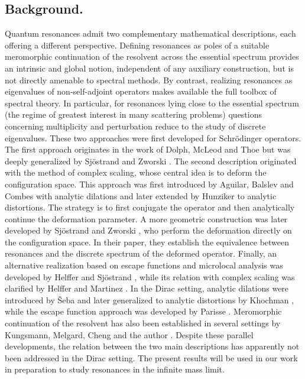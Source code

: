 \documentclass[a4paper, 12pt]{amsart}
\numberwithin{equation}{section}
\begin{document}
\subsection*{Background.} Quantum resonances admit two complementary mathematical descriptions, each offering a different perspective. Defining resonances as poles of a suitable meromorphic continuation of the resolvent across the essential spectrum provides an intrinsic and global notion, independent of any auxiliary construction, but is not directly amenable to spectral methods. By contrast, realizing resonances as eigenvalues of non-self-adjoint operators makes available the full toolbox of spectral theory. In particular, for resonances lying close to the essential spectrum (the regime of greatest interest in many scattering problems) questions concerning multiplicity and perturbation reduce to the study of discrete eigenvalues. These two approaches were first developed for Schrödinger operators. The first approach originates in the work of Dolph, McLeod and Thoe \cite{DoMcLTh66} but was deeply generalized by Sjöstrand and Zworski \cite{SjZw91}. The second description originated with the method of complex scaling, whose central idea is to deform the configuration space. This approach was first introduced by Aguilar, Balslev and Combes \cite{AgCo71,BaCo71} with analytic dilations and later extended by Hunziker \cite{Hu86} to analytic distortions. The strategy is to first conjugate the operator and then analytically continue the deformation parameter. A more geometric construction was later developed by Sjöstrand and Zworski \cite{SjZw91}, who perform the deformation directly on the configuration space. In their paper, they establish the equivalence between resonances and the discrete spectrum of the deformed operator. Finally, an alternative realization based on escape functions and microlocal analysis was developed by Helffer and Sjöstrand \cite{HeSj86}, while its relation with complex scaling was clarified by Helffer and Martinez \cite{HeMa87}. In the Dirac setting, analytic dilations were introduced by Šeba \cite{Se88} and later generalized to analytic distortions by Khochman \cite{Kh07}, while the escape function approach was developed by Parisse \cite{Pa91}. Meromorphic continuation of the resolvent has also been established in several settings by Kungsmann, Melgard, Cheng and the author \cite{KuMe17,ChMe21,Du25}. Despite these parallel developments, the relation between the two main descriptions has apparently not been addressed in the Dirac setting. The present results will be used in our work in preparation \cite{Du26} to study resonances in the infinite mass limit.
\end{document}
